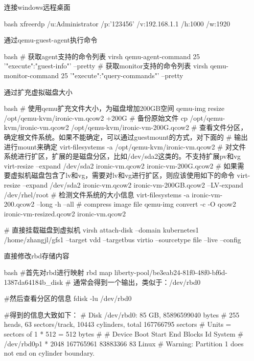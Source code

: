 \begin{outline}[enumerate]
\1 连接windows远程桌面
\begin{code-in-enumerate}{bash}
xfreerdp /u:Administrator /p:'123456' /v:192.168.1.1  /h:1000 /w:1920
\end{code-in-enumerate}

\1 通过qemu-guest-agent执行命令
\begin{code-in-enumerate}{bash}
# 获取agent支持的命令列表
virsh qemu-agent-command 25 '{"execute":"guest-info"}' --pretty
# 获取monitor支持的命令列表
virsh qemu-monitor-command 25 '{"execute":"query-commands"}' --pretty
\end{code-in-enumerate}

\1 通过扩充虚拟磁盘大小
\begin{code-in-enumerate}{bash}
# 使用qemu扩充文件大小，为磁盘增加200GB空间
qemu-img resize /opt/qemu-kvm/ironic-vm.qcow2 +200G
# 备份原始文件
cp /opt/qemu-kvm/ironic-vm.qcow2 /opt/qemu-kvm/ironic-vm-200G.qcow2
# 查看文件分区，确定根文件系统。如果不能确定，可以通过guestmount的方式，对下面的
# 输出进行mount来确定
virt-filesystems -a /opt/qemu-kvm/ironic-vm.qcow2
# 对文件系统进行扩区，扩展的是磁盘分区，比如/dev/sda2这类的。不支持扩展pv和vg
virt-resize --expand /dev/sda2 ironic-vm.qcow2 ironic-vm-200G.qcow2
# 如果需要虚拟机磁盘包含了lv和vg，需要对lv和vg进行扩区，则应该使用如下的命令
virt-resize --expand /dev/sda2 ironic-vm.qcow2 ironic-vm-200GB.qcow2 --LV-expand /dev/rhel/root
# 检测文件系统的大小信息
virt-filesystems -a ironic-vm-200.qcow2 --long -h --all
# compress image file
qemu-img convert -c -O qcow2 ironic-vm-resized.qcow2 ironic-vm.qcow2

# 直接挂载磁盘到虚拟机
virsh attach-disk --domain kubernetes1  /home/zhangjl/gfs1 --target vdd --targetbus virtio  --sourcetype file --live --config
\end{code-in-enumerate}

\1 直接修改rbd存储内容
\begin{code-in-enumerate}{bash}
#首先对rbd进行映射
rbd map liberty-pool/be3eab24-81f0-48f0-bf6d-1387da64184b_disk
# 通常会得到一个输出，类似于：/dev/rbd0

#然后查看分区的信息
fdisk -lu /dev/rbd0

#得到的信息大致如下：
# Disk /dev/rbd0: 85 GB, 85896599040 bytes
# 255 heads, 63 sectors/track, 10443 cylinders, total 167766795 sectors
# Units = sectors of 1 * 512 = 512 bytes
#
#     Device Boot      Start         End      Blocks   Id  System
# /dev/rbd0p1   *        2048   167765961    83883366   83  Linux
# Warning: Partition 1 does not end on cylinder boundary.


\end{code-in-enumerate}
\end{outline}

